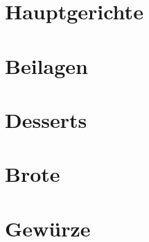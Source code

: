 \documentclass{book}
\begin{document}
 \tableofcontents
\chapter{Hauptgerichte} 
\chapter{Beilagen} 
\chapter{Desserts} 
\chapter{Brote} 
\chapter{Gewürze} 
\end{document}
